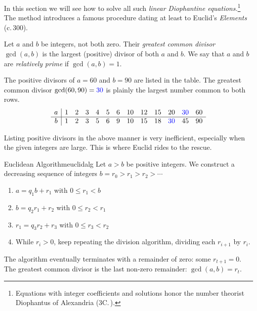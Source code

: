 In this section we will see how to solve all such \emph{linear Diophantine equations.}\footnote{Equations with integer coefficients and solutions honor the number theorist Diophantus of Alexandria (3\rd{}C.\,\CE).}
The method introduces a famous procedure dating at least to Euclid's \emph{Elements} (c.\,300\BCE).

\begin{defn}{}{}
	Let $a$ and $b$ be integers, not both zero. Their \emph{greatest common divisor} $\gcd(a,b)$ is the largest (positive) divisor of both $a$ and $b$. We say that $a$ and $b$ are \emph{relatively prime} if $\gcd(a,b)=1$.
\end{defn}

\begin{example}{}{}
	The positive divisors of $a=60$ and $b=90$ are listed in the table. The greatest common divisor $\gcd(60,90)=\textcolor{blue}{30}$ is plainly the largest number common to both rows.
	\[
		\begin{array}{c|cccccccccccc}
			a&1&2&3&4&5&6&10&12&15&20&\textcolor{blue}{30}&60\\\hline
			b&1&2&3&5&6&9&10&15&18&\textcolor{blue}{30}&45&90
		\end{array}
	\]
\end{example}

Listing positive divisors in the above manner is very inefficient, especially when the given integers are large. This is where Euclid rides to the rescue.

\begin{thm}{Euclidean Algorithm}{euclidalg}
	Let $a>b$ be positive integers. We construct a decreasing sequence of integers
		$b=r_0>r_1>r_2>\cdots$
	\begin{enumerate}\itemsep2pt
		\item {}$a=q_1b+r_1$ with $0\le r_1<b$
		\item {}$b=q_2r_1+r_2$ with $0\le r_2<r_1$
		\item {}$r_1=q_3r_2+r_3$ with $0\le r_3<r_2$
		\item While $r_i>0$, keep repeating the division algorithm, dividing each $r_{i+1}$ by $r_i$.
	\end{enumerate}
	The algorithm eventually terminates with a remainder of zero: some $r_{t+1}=0$. The greatest common divisor is the last non-zero remainder: $\gcd(a,b)=r_t$.
\end{thm}

